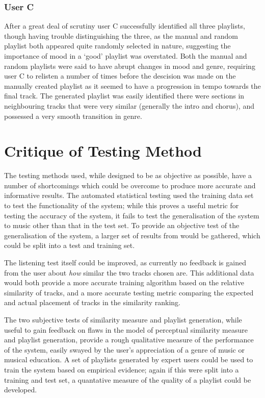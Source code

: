 \subsubsection{User C}
After a great deal of scrutiny user C successfully identified all three playlists, though having trouble distinguishing the three, as the manual and random playlist both appeared quite randomly selected in nature, suggesting the importance of mood in a `good' playlist was overstated. Both the manual and random playlists were said to have abrupt changes in mood and genre, requiring user C to relisten a number of times before the descision was made on the manually created playlist as it seemed to have a progression in tempo towards the final track. The generated playlist was easily identified there were sections in neighbouring tracks that were very similar (generally the intro and chorus), and possessed a very smooth transition in genre.
\section{Critique of Testing Method}
The testing methods used, while designed to be as objective as possible, have a number of shortcomings which could be overcome to produce more accurate and informative results. The automated statistical testing used the training data set to test the functionality of the system; while this proves a useful metric for testing the accuracy of the system, it fails to test the generalisation of the system to music other than that in the test set. To provide an objective test of the generalisation of the system, a larger set of results from  would be gathered, which could be split into a test and training set.

The listening test itself could be improved, as currently no feedback is gained from the user about \emph{how} similar the two tracks chosen are. This additional data would both provide a more accurate training algorithm based on the relative similarity of tracks, and a more accurate testing metric comparing the expected and actual placement of tracks in the similarity ranking.

The two subjective tests of similarity measure and playlist generation, while useful to gain feedback on flaws in the model of perceptual similarity measure and playlist generation, provide a rough qualitative measure of the performance of the system, easily swayed by the user's appreciation of a genre of music or musical education. A set of playlists generated by expert users could be used to train the system based on empirical evidence; again if this were split into a training and test set, a quantative measure of the quality of a playlist could be developed.
